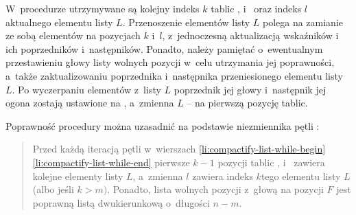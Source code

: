 W~procedurze utrzymywane są kolejny indeks $k$ tablic ,  i~ oraz indeks $l$ aktualnego elementu listy $L$.
Przenoszenie elementów listy $L$ polega na zamianie ze sobą elementów na pozycjach $k$ i~$l$, z~jednoczesną aktualizacją wskaźników  i~ ich poprzedników i~następników.
Ponadto, należy pamiętać o~ewentualnym przestawieniu głowy listy wolnych pozycji w~celu utrzymania jej poprawności, a~także zaktualizowaniu poprzednika i~następnika przeniesionego elementu listy $L$.
Po wyczerpaniu elementów z~listy $L$ poprzednik jej głowy i~następnik jej ogona zostają ustawione na , a~zmienna $L$ -- na pierwszą pozycję tablic.

Poprawność procedury można uzasadnić na podstawie niezmiennika pętli :
\begin{quote}
Przed każdą iteracją pętli  w~wierszach \ref{li:compactify-list-while-begin}\nbendash\ref{li:compactify-list-while-end} pierwsze $k-1$ pozycji tablic ,  i~ zawiera kolejne elementy listy $L$, a~zmienna $l$ zawiera indeks $k$\nbhyphen tego elementu listy $L$ (albo  jeśli $k>m)$.
Ponadto, lista wolnych pozycji z~głową na pozycji $F$ jest poprawną listą dwukierunkową o~długości $n-m$.
\end{quote}
